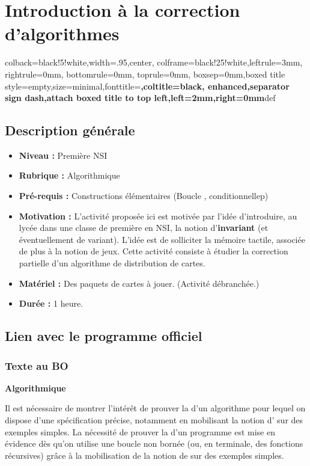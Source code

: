 \chapter{Introduction à la correction d'algorithmes}
\newenvironment{question}{\begin{center}<< \bfseries\itshape}{ >>\end{center}}
%
{colback=black!5!white,width=.95\linewidth,center,
colframe=black!25!white,leftrule=3mm, rightrule=0mm, bottomrule=0mm, toprule=0mm,
boxsep=0mm,boxed title style={empty,size=minimal},fonttitle=\bfseries,coltitle=black,
enhanced,separator sign dash,attach boxed title to top left,left=2mm,right=0mm}{def}

\section{Description générale}
\begin{itemize}
	\item {\bfseries Niveau :} Première NSI
	\item {\bfseries Rubrique :} Algorithmique
	\item {\bfseries Pré-requis :}
	Constructions élémentaires (Boucle , conditionnellep) 
	\item {\bfseries Motivation :} L'activité proposée ici est motivée par l'idée d'introduire, au lycée dans une classe de première en NSI, la notion d'\textbf{invariant} (et éventuellement de variant). L'idée est de solliciter la mémoire tactile, associée de plus à la notion de jeux. Cette activité consiste à étudier la correction partielle d'un algorithme de distribution de cartes.
	\item {\bfseries Matériel :} Des paquets de cartes à jouer. (Activité débranchée.)
	\item {\bfseries Durée :} 1 heure.
\end{itemize}

\section{Lien avec le programme officiel}

\subsection{Texte au BO}

{\bfseries Algorithmique}

Il est nécessaire de montrer l'intérêt de prouver la  d'un algorithme pour lequel on dispose d'une spécification précise, notamment en mobilisant la notion d' sur des exemples simples. La nécessité de prouver la  d'un programme est mise en évidence dès qu'on utilise une boucle non bornée (ou, en terminale, des fonctions récursives) grâce à la mobilisation de la notion de  sur des exemples simples.

